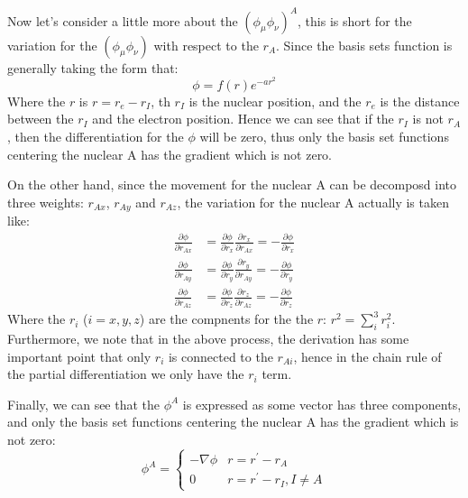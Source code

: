 Now let's consider a little more about the $(\phi_{\mu}\phi_{\nu
})^{A}$, this is short for the variation for the $(\phi_{\mu}\phi_{\nu
})$ with respect to the $r_{A}$. Since the basis sets function is
generally taking the form that:
\begin{equation}
 \phi = f(r)e^{-ar^{2}}
\end{equation}
Where the $r$ is $r = r_{e} - r_{I}$, th $r_{I}$ is the nuclear
position, and the $r_{e}$ is the distance between the $r_{I}$ and the
electron position. Hence we can see that if the $r_{I}$ is not
$r_{A}$, then the differentiation for the $\phi$ will be zero, thus
only the basis set functions centering the nuclear A has the gradient
which is not zero. 

On the other hand, since the movement for the nuclear A can be
decomposd into three weights: $r_{Ax}$, $r_{Ay}$ and $r_{Az}$,
the variation for the nuclear A actually is taken like:
\begin{align}
\label{NUCLEAR_GRADIENT_DFTeq:6}
\frac{\partial \phi}{\partial r_{Ax}} &= \frac{\partial
\phi}{\partial r_{x}}\frac{\partial r_{x}}{\partial r_{Ax}}
=-\frac{\partial\phi}{\partial r_{x}}  \nonumber \\
\frac{\partial \phi}{\partial r_{Ay}} &= \frac{\partial
\phi}{\partial r_{y}}\frac{\partial r_{y}}{\partial r_{Ay}}
=-\frac{\partial\phi}{\partial r_{y}}  \nonumber \\\frac{\partial
\phi}{\partial r_{Az}} &= \frac{\partial
\phi}{\partial r_{z}}\frac{\partial r_{z}}{\partial r_{Az}}
=-\frac{\partial\phi}{\partial r_{z}} 
\end{align}
Where the $r_{i}$ ($i=x,y,z$) are the compnents for the the $r$:
$r^{2} = \sum_{i}^{3}r_{i}^{2}$. Furthermore, we note that in the
above process, the derivation has some important point that only
$r_{i}$ is connected to the $r_{Ai}$, hence in the chain rule of
the partial differentiation we only have the $r_{i}$ term.

Finally, we can see that the $\phi^{A}$ is expressed as some vector
has three components, and only the basis set functions centering the
nuclear A has the gradient which is not zero:
\begin{equation}
\label{NUCLEAR_GRADIENT_DFTeq:3}
\phi^{A} =
 \begin{cases}
 -\nabla\phi & r = r^{'} - r_{A} \\
 0           & r = r^{'} - r_{I}, I \neq A
 \end{cases}
\end{equation} 


